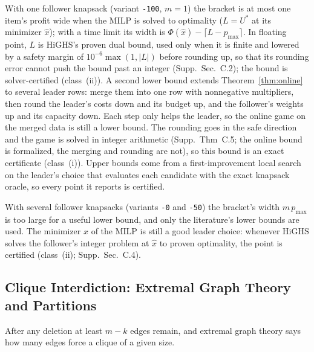 \documentclass[]{spie}  %
\theoremstyle{plain}
\newcommand{\supp}[1]{Supp.\ Sec.~#1}
\newcommand{\code}[1]{\texttt{#1}}
\newcommand{\pmax}{p_{\max}}
\newcommand{\cls}[1]{class~(#1)}             %
\begin{document}
With one follower knapsack (variant \code{-100}, $m=1$) the bracket is at most one item's profit
wide when the MILP is solved to optimality ($L=U^*$ at its minimizer $\hat x$); with a time limit
its width is $\Phi(\hat x)-\lceil L-\pmax\rceil$. In floating point, $L$ is HiGHS's proven dual
bound, used only when it is finite and lowered by a safety margin of $10^{-6}\max(1,|L|)$ before
rounding up, so that its rounding error cannot push the bound past an integer (\supp{C.2}); the
bound is solver-certified (\cls{ii}). A second lower bound extends Theorem~\ref{thm:online} to
several leader rows: merge them into one row with nonnegative multipliers, then round the
leader's costs down and its budget up, and the follower's weights up and its capacity down. Each
step only helps the leader, so the online game on the merged data is still a lower bound. The
rounding goes in the safe direction and the game is solved in integer arithmetic (Supp.\ Thm~C.5;
the online bound is formalized, the merging and rounding are not), so this bound is an exact
certificate (\cls{i}). Upper bounds come from a
first-improvement local search on the leader's choice that evaluates each candidate with the exact
knapsack oracle, so every point it reports is certified.

With several follower knapsacks (variants \code{-0} and \code{-50}) the bracket's width
$m\,\pmax$ is too large for a useful lower bound, and only the literature's lower bounds are used.
The minimizer $\hat x$ of the MILP is still a good leader choice: whenever HiGHS solves the
follower's integer problem at $\hat x$ to proven optimality, the point is certified (\cls{ii};
\supp{C.4}).

\subsection{Clique Interdiction: Extremal Graph Theory and Partitions}\label{sec:clique}

After any deletion at least $m-k$ edges remain, and extremal graph theory says how many edges
force a clique of a given size.
\end{document}
